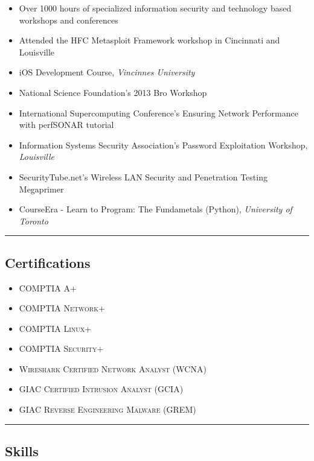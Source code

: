 \documentclass[10pt,letterpaper]{article}
\begin{document}
\begin{itemize}
	\parskip=0.1em

	\item Over 1000 hours of specialized information security and technology based workshops and conferences
	\item Attended the HFC Metasploit Framework workshop in Cincinnati and Louisville
	\item iOS Development Course, \textit{Vincinnes University}
	\item National Science Foundation's 2013 Bro Workshop
	\item International Supercomputing Conference's Ensuring Network Performance with perfSONAR tutorial
	\item Information Systems Security Association's Password Exploitation Workshop, \textit{Louisville}
	\item SecurityTube.net's Wireless LAN Security and Penetration Testing Megaprimer
	\item CourseEra - Learn to Program: The Fundametals (Python), \textit{University of Toronto}
\end{itemize}

\hrule
\vspace{-0.4em}
\subsection*{Certifications}

\begin{itemize}
	\parskip=0.1em

	\item \textsc{COMPTIA A+}
	\item \textsc{COMPTIA Network+}
	\item \textsc{COMPTIA Linux+}
	\item \textsc{COMPTIA Security+}
	\item \textsc{Wireshark Certified Network Analyst (WCNA)}
	\item \textsc{GIAC Certified Intrusion Analyst (GCIA)}
	\item \textsc{GIAC Reverse Engineering Malware (GREM)}

\end{itemize}

\hrule
\vspace{-0.4em}
\subsection*{Skills}
\end{document}
